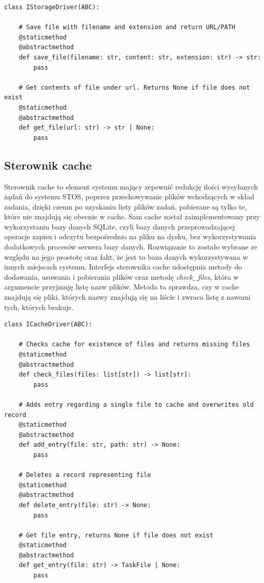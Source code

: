 \lstset{style=python}
\begin{lstlisting}[caption = {Interfejs sterownika systemu plików.}]
    class IStorageDriver(ABC):
    
    # Save file with filename and extension and return URL/PATH
    @staticmethod
    @abstractmethod
    def save_file(filename: str, content: str, extension: str) -> str:
        pass

    # Get contents of file under url. Returns None if file does not exist
    @staticmethod
    @abstractmethod
    def get_file(url: str) -> str | None:
        pass
\end{lstlisting}

\subsection{Sterownik cache}
Sterownik cache to element systemu mający zepewnić redukcję ilości wysyłanych żądań do systemu STOS, poprzez przechowywanie plików wchodzących w skład zadania, dzięki czemu po uzyskaniu listy plików zadań, pobierane są tylko te, które nie znajdują się obecnie w cache. Sam cache został zaimplementowany przy wykorzystaniu bazy danych SQLite\cite{sqlite}, czyli bazy danych przeprowadzającej operacje zapisu i odczytu bezpośrednio na pliku na dysku, bez wykorzystywania dodatkowych procesów serwera bazy danych. Rozwiązanie to zostało wybrane ze względu na jego prostotę oraz fakt, że jest to baza danych wykorzystywana w innych miejscach systemu. Interfejs sterownika cache udostępnia metody do dodawania, usuwania i pobierania plików oraz metodę \textit{check\_files}, która w argumencie przyjmuję listę nazw plików. Metoda ta sprawdza, czy w cache znajdują się pliki, których nazwy znajdują się na liście i zwraca listę z nawami tych, których brakuje.
\lstset{style=python}
\begin{lstlisting}[caption = {Interfejs sterownika systemu plików.}]
    class ICacheDriver(ABC):

    # Checks cache for existence of files and returns missing files
    @staticmethod
    @abstractmethod
    def check_files(files: list[str]) -> list[str]:
        pass

    # Adds entry regarding a single file to cache and overwrites old record
    @staticmethod
    @abstractmethod
    def add_entry(file: str, path: str) -> None:
        pass

    # Deletes a record representing file
    @staticmethod
    @abstractmethod
    def delete_entry(file: str) -> None:
        pass

    # Get file entry, returns None if file does not exist
    @staticmethod
    @abstractmethod
    def get_entry(file: str) -> TaskFile | None:
        pass
\end{lstlisting}

